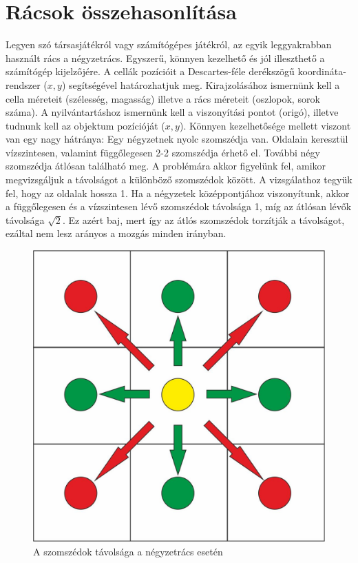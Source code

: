 
\section{Rácsok összehasonlítása}

Legyen szó társasjátékról vagy számítógépes játékról, az egyik leggyakrabban használt rács a négyzetrács. Egyszerű, könnyen kezelhető és jól illeszthető a számítógép kijelzőjére.
\newline A cellák pozícióit a Descartes-féle derékszögű koordináta-rendszer ($x, y$) segítségével határozhatjuk meg. 
\newline Kirajzolásához ismernünk kell a cella méreteit (szélesség, magasság) illetve a rács méreteit (oszlopok, sorok száma). 
\newline A nyilvántartáshoz ismernünk kell a viszonyítási pontot (origó), illetve tudnunk kell az objektum pozícióját ($x, y$).
\newline
\newline Könnyen kezelhetősége mellett viszont van egy nagy hátránya:
Egy négyzetnek nyolc szomszédja van. Oldalain keresztül vízszintesen, valamint függőlegesen 2-2 szomszédja érhető el. További négy szomszédja átlósan található meg. A problémára akkor figyelünk fel, amikor megvizsgáljuk a távolságot a különböző szomszédok között. A vizsgálathoz tegyük fel, hogy az oldalak hossza 1. Ha a négyzetek középpontjához viszonyítunk, akkor a függőlegesen és a vízszintesen lévő szomszédok távolsága 1, míg az átlósan lévők távolsága $\sqrt{2}$. Ez azért baj, mert így az átlós szomszédok torzítják a távolságot, ezáltal nem lesz arányos a mozgás minden irányban.

\begin{figure}[h!]
\centering
\includegraphics[scale=0.4]{kepek/SqDistance.jpg}
\caption{A szomszédok távolsága a négyzetrács esetén}
\label{fig:SqDistance}
\end{figure}

